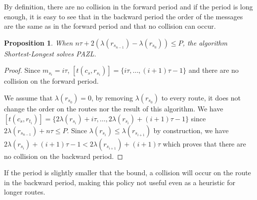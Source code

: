 \documentclass[a4paper,10pt]{article}
\newtheorem{proposition}{Proposition}
\begin{document}
     By definition, there are no collision in the forward period and if the period is long enough, 
     it is easy to see that in the backward period the order of the messages are the same as in the forward period and that no collision can occur. 
      
      
      \begin{proposition} When $n\tau + 2(\lambda(r_{s_{n-1}}) - \lambda(r_{s_0})) \leq P$, the algorithm Shortest-Longest solves PAZL.
      \end{proposition}
      \begin{proof}
       Since $m_{s_i} = i\tau$, $[t(c_s,r_{s_i})] = \{i\tau,\dots, (i+1)\tau -1\}$ and there are no collision on the forward period.
       
       
       We assume that $\lambda(r_{s_0}) = 0$, by removing $\lambda(r_{s_0})$ to every route, it does not change the order on the routes
       nor the result of this algorithm.
      We have  $[t(c_s,r_{t_i})] = \{2 \lambda(r_{s_i}) + i\tau, \dots,  2 \lambda(r_{s_i}) + (i+1)\tau -1\}$ since $2 \lambda(r_{s_{n-1 }}) + n\tau \leq P$.
       Since $ \lambda(r_{s_i}) \leq  \lambda(r_{s_{i+1}})$ by construction, we have  $2 \lambda(r_{s_i}) + (i+1)\tau -1 < 2 \lambda(r_{s_{i+1}}) + (i+1)\tau$
       which proves that there are no collision on the backward period. 
      \end{proof}

      
      If the period is slightly smaller that the bound, a collision will occur on the route in the backward period, making 
      this policy not useful even as a heuristic for longer routes. 
      
%       
% 
% 
%       
% 
%    
   
\end{document}
